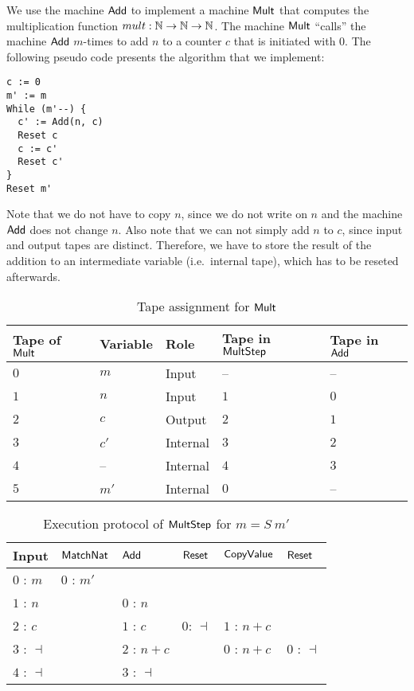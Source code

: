 We use the machine $\mathsf{Add}$ to implement a machine $\mathsf{Mult}$ that computes the multiplication function $mult : \mathbb{N}\rightarrow\mathbb{N}\rightarrow\mathbb{N}$.  The machine
$\mathsf{Mult}$ ``calls'' the machine $\mathsf{Add}$ $m$-times to add $n$ to a counter $c$ that is initiated with $0$.  The following pseudo code presents the
algorithm that we implement: { \small
\begin{lstlisting}[style=pseudocode]
c := 0
m' := m
While (m'--) {
  c' := Add(n, c)
  Reset c
  c := c'
  Reset c'
}
Reset m'
\end{lstlisting}
}%
Note that we do not have to copy $n$, since we do not write on $n$ and the machine $\mathsf{Add}$ does not change
$n$.  Also note that we can not simply add $n$ to $c$, since input and output tapes are distinct.  Therefore, we have to store the result of the
addition to an intermediate variable (i.e.\ internal tape), which has to be reseted afterwards.

\begin{table}[t]
  \centering
  \begin{tabular}{l|l|l|l|l}
    Tape of $\mathsf{Mult}$ & Variable & Role & Tape in $\mathsf{MultStep}$ & Tape in $\mathsf{Add}$ \\ \hline
    $0$ & $m$  & Input    & --  & --  \\
    $1$ & $n$  & Input    & $1$ & $0$ \\
    $2$ & $c$  & Output   & $2$ & $1$ \\
    $3$ & $c'$ & Internal & $3$ & $2$ \\
    $4$ & --   & Internal & $4$ & $3$ \\
    $5$ & $m'$ & Internal & $0$ & --  \\
  \end{tabular}
  \caption{Tape assignment for $\mathsf{Mult}$}
  \label{tab:tapes-Mult}
\end{table}
\begin{table}[t]
  \centering
  \begin{tabular}{l||l|l|l|l|l}
    Input          & $\mathsf{MatchNat}$ & $\mathsf{Add}$     & $\mathsf{Reset}$  & $\mathsf{CopyValue}$ & $\mathsf{Reset}$   \\ \hline
    $0$ : $m$      & $0$ : $m'$      &                &               &                  &                \\
    $1$ : $n$      &                 & $0$ : $n$      &               &                  &                \\
    $2$ : $c$      &                 & $1$ : $c$      & $0$: $\dashv$ & $1$ : $n+c$      &                \\
    $3$ : $\dashv$ &                 & $2$ : $n+c$    &               & $0$ : $n+c$      & $0$ : $\dashv$ \\
    $4$ : $\dashv$ &                 & $3$ : $\dashv$ &               &                  &                \\
  \end{tabular}
  \caption{Execution protocol of $\mathsf{MultStep}$ for $m=S~m'$}
  \label{tab:exec-MultStep}
\end{table}

